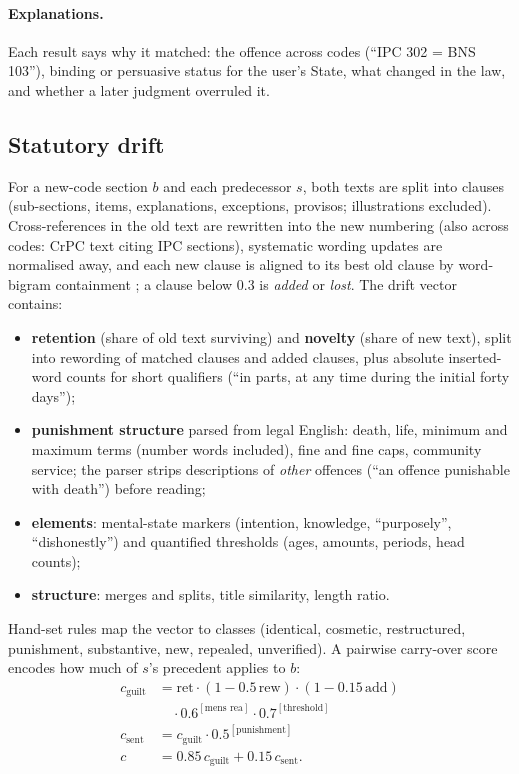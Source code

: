 \documentclass[sigconf,nonacm]{acmart}
\begin{document}
\paragraph{Explanations.} Each result says why it matched: the offence across codes (``IPC 302 =
BNS 103''), binding or persuasive status for the user's State, what changed in the law, and whether
a later judgment overruled it.

\subsection{Statutory drift}\label{sec:drift}

For a new-code section $b$ and each predecessor $s$, both texts are split into clauses
(sub-sections, items, explanations, exceptions, provisos; illustrations excluded). Cross-references
in the old text are rewritten into the new numbering (also across codes: CrPC text citing IPC
sections), systematic wording updates are normalised away, and each new clause is aligned to its
best old clause by word-bigram containment \cite{broder1997}; a clause below 0.3 is \emph{added} or
\emph{lost}. The drift vector contains:
\begin{itemize}
\item \textbf{retention} (share of old text surviving) and \textbf{novelty} (share of new text),
split into rewording of matched clauses and added clauses, plus absolute inserted-word counts for
short qualifiers (``in parts, at any time during the initial forty days'');
\item \textbf{punishment structure} parsed from legal English: death, life, minimum and maximum
terms (number words included), fine and fine caps, community service; the parser strips
descriptions of \emph{other} offences (``an offence punishable with death'') before reading;
\item \textbf{elements}: mental-state markers (intention, knowledge, ``purposely'', ``dishonestly'')
and quantified thresholds (ages, amounts, periods, head counts);
\item \textbf{structure}: merges and splits, title similarity, length ratio.
\end{itemize}
Hand-set rules map the vector to classes (identical, cosmetic, restructured, punishment,
substantive, new, repealed, unverified). A pairwise carry-over score encodes how much of $s$'s
precedent applies to $b$:
\begin{align*}
c_{\text{guilt}} &= \text{ret}\cdot(1-0.5\,\text{rew})\cdot(1-0.15\,\text{add})\\
&\quad\cdot 0.6^{[\text{mens rea}]}\cdot 0.7^{[\text{threshold}]}\\
c_{\text{sent}} &= c_{\text{guilt}}\cdot 0.5^{[\text{punishment}]}\\
c &= 0.85\,c_{\text{guilt}} + 0.15\,c_{\text{sent}}.
\end{align*}
\end{document}
